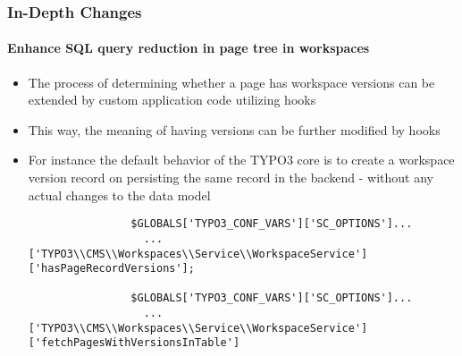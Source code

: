 \begin{frame}[fragile]
	\frametitle{In-Depth Changes}
	\framesubtitle{Enhance SQL query reduction in page tree in workspaces}

	\lstset{basicstyle=\tiny\ttfamily}

	\begin{itemize}

		\item The process of determining whether a page has workspace versions
			can be extended by custom application code utilizing hooks

		\item This way, the meaning of having versions can be further modified
			by hooks

		\item For instance the default behavior of the TYPO3 core is to create
			a workspace version record on persisting the same record in the
			backend - without any actual changes to the data model

			\begin{lstlisting}
				$GLOBALS['TYPO3_CONF_VARS']['SC_OPTIONS']...
				  ...['TYPO3\\CMS\\Workspaces\\Service\\WorkspaceService']['hasPageRecordVersions'];

				$GLOBALS['TYPO3_CONF_VARS']['SC_OPTIONS']...
				  ...['TYPO3\\CMS\\Workspaces\\Service\\WorkspaceService']['fetchPagesWithVersionsInTable']
			\end{lstlisting}

	\end{itemize}

\end{frame}


